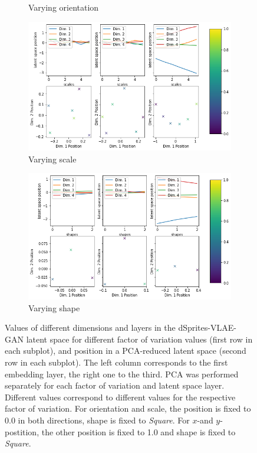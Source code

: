 \begin{figure}
\begin{subfigure}{.48\textwidth}
        \caption{Varying orientation}
    \end{subfigure}
    \hfill
    \begin{subfigure}{.48\textwidth}
        \centering
        \includegraphics[width=\textwidth]{images/latent_space_traversals/vlae_gan_dsprites_scale_latent_space_values.png}
        \caption{Varying scale}
    \end{subfigure}
    \vfill
    \begin{subfigure}{.48\textwidth}
        \centering
        \includegraphics[width=\textwidth]{images/latent_space_traversals/vlae_gan_dsprites_shape_latent_space_values.png}
        \caption{Varying shape}
    \end{subfigure}
    \caption[dSprites-VLAE-GAN: Latent Space Values]{Values of different dimensions and layers in the dSprites-\ac{VLAE}-\ac{GAN} latent space for different factor of variation values (first row in each subplot), and position in a \ac{PCA}-reduced latent space (second row in each subplot). The left column corresponds to the first embedding layer, the right one to the third. \ac{PCA} was performed separately for each factor of variation and latent space layer. Different values correspond to different values for the respective factor of variation. For orientation and scale, the position is fixed to 0.0 in both directions, shape is fixed to \textit{Square}. For $x$-and $y$-postition, the other position is fixed to 1.0 and shape is fixed to \textit{Square}.}
    \label{fig:vlae_gan_dsprites_latent_space_values}
\end{figure}
